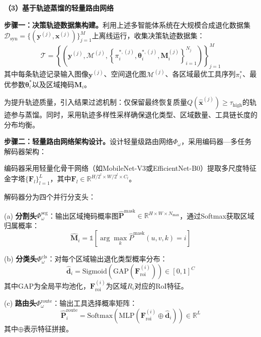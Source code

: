 \textbf{（3）基于轨迹蒸馏的轻量路由网络}

\textbf{步骤一：决策轨迹数据集构建。}利用上述多智能体系统在大规模合成退化数据集$\mathcal{D}_{\text{syn}} = \{(\mathbf{y}^{(j)}, \mathbf{x}^{(j)})\}_{j=1}^{M}$上离线运行，收集决策轨迹数据集：
\begin{equation}
\mathcal{T} = \left\{\left(\mathbf{y}^{(j)}, \mathcal{M}^{(j)}, \left\{\pi_i^{*,(j)}, \boldsymbol{\theta}_i^{*,(j)}, \mathbf{M}_i^{(j)}\right\}_{i=1}^{N_j}\right)\right\}_{j=1}^{M}
\end{equation}
其中每条轨迹记录输入图像$\mathbf{y}^{(j)}$、空间退化图$\mathcal{M}^{(j)}$、各区域最优工具序列$\pi_i^{*}$、最优参数$\boldsymbol{\theta}_i^{*}$以及区域掩码$\mathbf{M}_i$。

为提升轨迹质量，引入结果过滤机制：仅保留最终恢复质量$Q(\hat{\mathbf{x}}^{(j)}) \geq \tau_{\text{high}}$的轨迹参与蒸馏。同时，采用轨迹多样性采样确保退化类型、区域数量、工具链长度的分布均衡。

\textbf{步骤二：轻量路由网络架构设计。}设计轻量级路由网络$\Phi_{\omega}$，采用编码器—多任务解码器架构：

编码器采用轻量化骨干网络（如MobileNet-V3或EfficientNet-B0）提取多尺度特征金字塔$\{\mathbf{F}_l\}_{l=1}^{L}$，其中$\mathbf{F}_l \in \mathbb{R}^{H/2^l \times W/2^l \times C_l}$。

解码器分为四个并行分支头：

(a) \textbf{分割头}$\Phi_{\omega}^{\text{seg}}$：输出区域掩码概率图$\hat{\mathbf{P}}^{\text{mask}} \in \mathbb{R}^{H \times W \times N_{\max}}$，通过Softmax获取区域归属概率：
\begin{equation}
\hat{\mathbf{M}}_i = \mathbb{1}\left[\arg\max_k \hat{P}^{\text{mask}}(u,v,k) = i\right]
\end{equation}

(b) \textbf{分类头}$\Phi_{\omega}^{\text{cls}}$：对每个区域输出退化类型概率分布：
\begin{equation}
\hat{\mathbf{d}}_i = \text{Sigmoid}\left(\text{GAP}\left(\mathbf{F}_{\text{roi}}^{(i)}\right)\right) \in [0,1]^{C}
\end{equation}
其中$\text{GAP}$为全局平均池化，$\mathbf{F}_{\text{roi}}^{(i)}$为区域$R_i$对应的RoI特征。

(c) \textbf{路由头}$\Phi_{\omega}^{\text{route}}$：输出工具选择概率矩阵：
\begin{equation}
\hat{\mathbf{P}}^{\text{route}}_i = \text{Softmax}\left(\text{MLP}\left(\mathbf{F}_{\text{roi}}^{(i)} \oplus \hat{\mathbf{d}}_i\right)\right) \in \mathbb{R}^{L}
\end{equation}
其中$\oplus$表示特征拼接。

